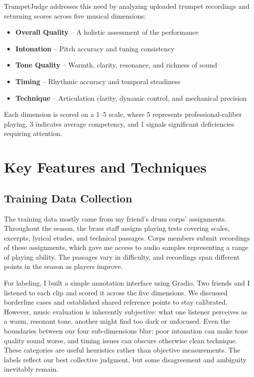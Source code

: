 \documentclass[10pt, a4paper, twocolumn]{article}
\begin{document}
TrumpetJudge addresses this need by analyzing uploaded trumpet recordings and returning scores across five musical dimensions:

\begin{itemize}
    \item \textbf{Overall Quality} -- A holistic assessment of the performance
    \item \textbf{Intonation} -- Pitch accuracy and tuning consistency
    \item \textbf{Tone Quality} -- Warmth, clarity, resonance, and richness of sound
    \item \textbf{Timing} -- Rhythmic accuracy and temporal steadiness
    \item \textbf{Technique} -- Articulation clarity, dynamic control, and mechanical precision
\end{itemize}

Each dimension is scored on a 1--5 scale, where 5 represents professional-caliber playing, 3 indicates average competency, and 1 signals significant deficiencies requiring attention.

\section{Key Features and Techniques}

\subsection*{Training Data Collection}

The training data mostly came from my friend's drum corps' assignments. Throughout the season, the brass staff assigns playing tests covering scales, excerpts, lyrical etudes, and technical passages. Corps members submit recordings of these assignments, which gave me access to audio samples representing a range of playing ability. The passages vary in difficulty, and recordings span different points in the season as players improve.

For labeling, I built a simple annotation interface using Gradio. Two friends and I listened to each clip and scored it across the five dimensions. We discussed borderline cases and established shared reference points to stay calibrated. However, music evaluation is inherently subjective: what one listener perceives as a warm, resonant tone, another might find too dark or unfocused. Even the boundaries between our four sub-dimensions blur: poor intonation can make tone quality sound worse, and timing issues can obscure otherwise clean technique. These categories are useful heuristics rather than objective measurements. The labels reflect our best collective judgment, but some disagreement and ambiguity inevitably remain.
\end{document}
